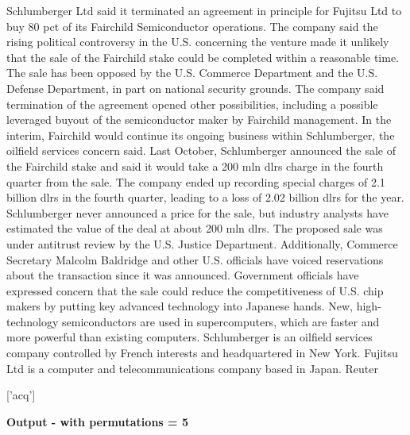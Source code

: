 \documentclass{article}
\begin{document}
\begin{pythonOutput}
Schlumberger Ltd said it terminated an
agreement in principle for Fujitsu Ltd to buy 80 pct of its
Fairchild Semiconductor operations.
    The company said the rising political controversy in the
U.S. concerning the venture made it unlikely that the sale of
the Fairchild stake could be completed within a reasonable
time.
    The sale has been opposed by the U.S. Commerce Department
and the U.S. Defense Department, in part on national security
grounds.
    The company said termination of the agreement opened other
possibilities, including a possible leveraged buyout of the
semiconductor maker by Fairchild management.
    In the interim, Fairchild would continue its ongoing
business within Schlumberger, the oilfield services concern
said.
    Last October, Schlumberger announced the sale of the
Fairchild stake and said it would take a 200 mln dlrs charge in
the fourth quarter from the sale. The company ended up
recording special charges of 2.1 billion dlrs in the fourth
quarter, leading to a loss of 2.02 billion dlrs for the year.
    Schlumberger never announced a price for the sale, but
industry analysts have estimated the value of the deal at about
200 mln dlrs.
    The proposed sale was under antitrust review by the U.S.
Justice Department. Additionally, Commerce Secretary Malcolm
Baldridge and other U.S. officials have voiced reservations
about the transaction since it was announced.
    Government officials have expressed concern that the sale
could reduce the competitiveness of U.S. chip makers by putting
key advanced technology into Japanese hands.
    New, high-technology semiconductors are used in
supercomputers, which are faster and more powerful than
existing computers.
    Schlumberger is an oilfield services company controlled by
French interests and headquartered in New York. Fujitsu Ltd is
a computer and telecommunications company based in Japan.
 Reuter

['acq']

\end{pythonOutput}
\textbf{Output - with permutations = 5}\\
\end{document}
